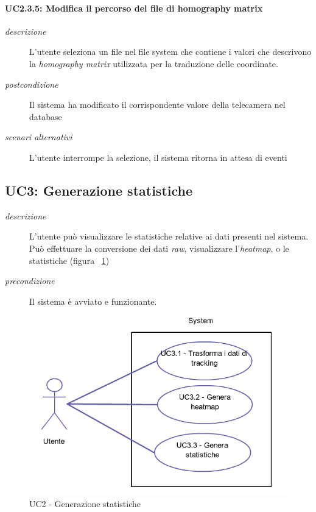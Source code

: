  \paragraph{UC2.3.5: Modifica il percorso del file di homography matrix}
\begin{description}
 \item[\em{descrizione}] L'utente seleziona un file nel file system che contiene i valori che descrivono la  \textit{homography matrix} utilizzata per la traduzione delle coordinate.
   \item[\em{postcondizione}] Il sistema ha modificato il corrispondente valore della telecamera nel database
  \item[\em{scenari alternativi}] L'utente interrompe la selezione, il sistema ritorna in attesa di eventi
 \end{description}
 
\subsection{UC3: Generazione statistiche}
\begin{description}
 \item[\em{descrizione}] L'utente può visualizzare le statistiche relative ai dati presenti nel sistema. Può effettuare la conversione dei dati \textit{raw}, visualizzare l'\textit{heatmap}, o le statistiche (figura ~\ref{fig:uc3})
 \item[\em{precondizione}] Il sistema è avviato e funzionante.
  \end{description}
\begin{figure}[htpb]
\centering
\includegraphics[scale=0.4]{./images/uc3.png}
\caption{UC2 - Generazione statistiche}
\label{fig:uc3}
\end{figure}  
 
